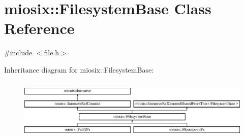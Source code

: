 \hypertarget{classmiosix_1_1_filesystem_base}{\section{miosix\-:\-:Filesystem\-Base Class Reference}
\label{classmiosix_1_1_filesystem_base}
}


{\ttfamily \#include $<$file.\-h$>$}

Inheritance diagram for miosix\-:\-:Filesystem\-Base\-:\begin{figure}[H]
\begin{center}
\leavevmode
\includegraphics[height=2.962963cm]{classmiosix_1_1_filesystem_base}
\end{center}
\end{figure}
